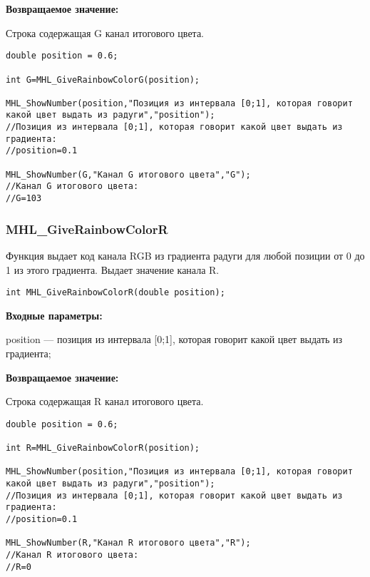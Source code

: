 \documentclass[a4paper,12pt]{article}
\begin{document}
\textbf{Возвращаемое значение:}

Строка содержащая G канал итогового цвета.


\begin{lstlisting}[label=code_use_MHL_GiveRainbowColorG,caption=Пример использования]
double position = 0.6;

int G=MHL_GiveRainbowColorG(position);

MHL_ShowNumber(position,"Позиция из интервала [0;1], которая говорит какой цвет выдать из радуги","position");
//Позиция из интервала [0;1], которая говорит какой цвет выдать из градиента:
//position=0.1

MHL_ShowNumber(G,"Канал G итогового цвета","G");
//Канал G итогового цвета:
//G=103
\end{lstlisting}

\subsubsection{MHL\_GiveRainbowColorR}\label{MHL_GiveRainbowColorR}

Функция выдает код канала RGB из градиента радуги для любой позиции от 0 до 1 из этого градиента. Выдает значение канала R.


\begin{lstlisting}[label=code_syntax_MHL_GiveRainbowColorR,caption=Синтаксис]
int MHL_GiveRainbowColorR(double position);
\end{lstlisting}

\textbf{Входные параметры:}  

position --- позиция из интервала [0;1], которая говорит какой цвет выдать из градиента;

\textbf{Возвращаемое значение:}

Строка содержащая R канал итогового цвета.


\begin{lstlisting}[label=code_use_MHL_GiveRainbowColorR,caption=Пример использования]
double position = 0.6;

int R=MHL_GiveRainbowColorR(position);

MHL_ShowNumber(position,"Позиция из интервала [0;1], которая говорит какой цвет выдать из радуги","position");
//Позиция из интервала [0;1], которая говорит какой цвет выдать из градиента:
//position=0.1

MHL_ShowNumber(R,"Канал R итогового цвета","R");
//Канал R итогового цвета:
//R=0
\end{lstlisting}

{}
\newpage
\end{document}
